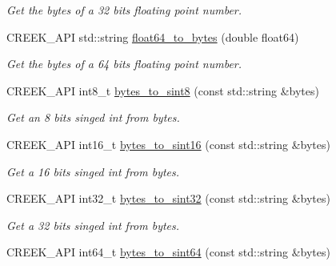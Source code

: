 \begin{DoxyCompactItemize}
\begin{DoxyCompactList}\small\item\em Get the bytes of a 32 bits floating point number. \end{DoxyCompactList}\item 
C\+R\+E\+E\+K\+\_\+\+A\+PI std\+::string \hyperlink{namespacecreek_1_1_endian_a578179e2604ee3470e186a082992c26b}{float64\+\_\+to\+\_\+bytes} (double float64)\hypertarget{namespacecreek_1_1_endian_a578179e2604ee3470e186a082992c26b}{}\label{namespacecreek_1_1_endian_a578179e2604ee3470e186a082992c26b}

\begin{DoxyCompactList}\small\item\em Get the bytes of a 64 bits floating point number. \end{DoxyCompactList}\item 
C\+R\+E\+E\+K\+\_\+\+A\+PI int8\+\_\+t \hyperlink{namespacecreek_1_1_endian_afd59fb5fb11baf8a39c1011ee207cb78}{bytes\+\_\+to\+\_\+sint8} (const std\+::string \&bytes)\hypertarget{namespacecreek_1_1_endian_afd59fb5fb11baf8a39c1011ee207cb78}{}\label{namespacecreek_1_1_endian_afd59fb5fb11baf8a39c1011ee207cb78}

\begin{DoxyCompactList}\small\item\em Get an 8 bits singed int from bytes. \end{DoxyCompactList}\item 
C\+R\+E\+E\+K\+\_\+\+A\+PI int16\+\_\+t \hyperlink{namespacecreek_1_1_endian_a87f2d3021abf77310160a19df2b19ed4}{bytes\+\_\+to\+\_\+sint16} (const std\+::string \&bytes)\hypertarget{namespacecreek_1_1_endian_a87f2d3021abf77310160a19df2b19ed4}{}\label{namespacecreek_1_1_endian_a87f2d3021abf77310160a19df2b19ed4}

\begin{DoxyCompactList}\small\item\em Get a 16 bits singed int from bytes. \end{DoxyCompactList}\item 
C\+R\+E\+E\+K\+\_\+\+A\+PI int32\+\_\+t \hyperlink{namespacecreek_1_1_endian_a593c74a027a0372c55296df5a8ce5d6c}{bytes\+\_\+to\+\_\+sint32} (const std\+::string \&bytes)\hypertarget{namespacecreek_1_1_endian_a593c74a027a0372c55296df5a8ce5d6c}{}\label{namespacecreek_1_1_endian_a593c74a027a0372c55296df5a8ce5d6c}

\begin{DoxyCompactList}\small\item\em Get a 32 bits singed int from bytes. \end{DoxyCompactList}\item 
C\+R\+E\+E\+K\+\_\+\+A\+PI int64\+\_\+t \hyperlink{namespacecreek_1_1_endian_a684faa056166a60919109562122dd6fc}{bytes\+\_\+to\+\_\+sint64} (const std\+::string \&bytes)\hypertarget{namespacecreek_1_1_endian_a684faa056166a60919109562122dd6fc}{}\label{namespacecreek_1_1_endian_a684faa056166a60919109562122dd6fc}


\end{DoxyCompactItemize}
